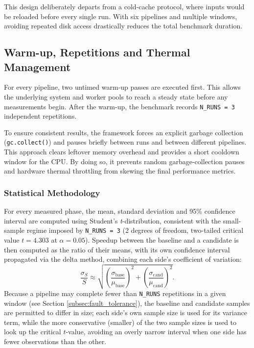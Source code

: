 \documentclass[10pt,twocolumn,letterpaper]{article}
\begin{document}
This design deliberately departs from a cold-cache protocol, where 
inputs would be reloaded before every single run. With six pipelines 
and multiple windows, avoiding repeated disk access drastically reduces 
the total benchmark duration.

\subsection{Warm-up, Repetitions and Thermal Management}
For every pipeline, two untimed warm-up passes are executed first. 
This allows the underlying system and worker pools to reach a steady 
state before any measurements begin. After the warm-up, the benchmark 
records \texttt{N\_RUNS = 3} independent repetitions. 

To ensure consistent results, the framework forces an explicit 
garbage collection (\texttt{gc.collect()}) and pauses briefly between 
runs and between different pipelines. This approach clears leftover 
memory overhead and provides a short cooldown window for the CPU. 
By doing so, it prevents random garbage-collection pauses and hardware 
thermal throttling from skewing the final performance metrics.

\subsubsection{Statistical Methodology}
For every measured phase, the mean, standard deviation and 95\% confidence interval are
computed using Student's \emph{t}-distribution, consistent with the
small-sample regime imposed by \texttt{N\_RUNS = 3} (2 degrees of freedom, two-tailed critical
value $t = 4.303$ at $\alpha = 0.05$). Speedup between the baseline and a candidate is then
computed as the ratio of their means, with its own confidence interval propagated via the
delta method, combining each side's coefficient of variation:
\[
\frac{\sigma_S}{S} \approx \sqrt{\left(\frac{\sigma_{\text{base}}}{\mu_{\text{base}}}\right)^2
+ \left(\frac{\sigma_{\text{cand}}}{\mu_{\text{cand}}}\right)^2}.
\]
Because a pipeline may complete fewer than \texttt{N\_RUNS} repetitions in a given window (see
Section \ref{subsec:fault_tolerance}), the baseline and candidate samples are permitted to differ in size;
each side's own sample size is used for its variance term, while the more conservative
(smaller) of the two sample sizes is used to look up the critical $t$-value, avoiding an
overly narrow interval when one side has fewer observations than the other.
\end{document}
